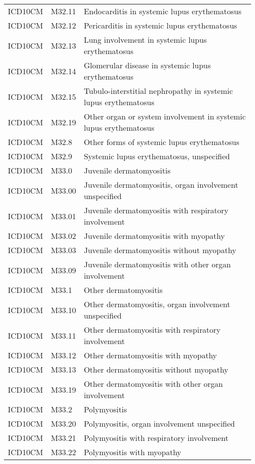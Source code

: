 \begin{longtable}{p{}p{}p{}}
  ICD10CM & M32.11 & Endocarditis in systemic lupus erythematosus \\ 
  ICD10CM & M32.12 & Pericarditis in systemic lupus erythematosus \\ 
  ICD10CM & M32.13 & Lung involvement in systemic lupus erythematosus \\ 
  ICD10CM & M32.14 & Glomerular disease in systemic lupus erythematosus \\ 
  ICD10CM & M32.15 & Tubulo-interstitial nephropathy in systemic lupus erythematosus \\ 
  ICD10CM & M32.19 & Other organ or system involvement in systemic lupus erythematosus \\ 
  ICD10CM & M32.8 & Other forms of systemic lupus erythematosus \\ 
  ICD10CM & M32.9 & Systemic lupus erythematosus, unspecified \\ 
  ICD10CM & M33.0 & Juvenile dermatomyositis \\ 
  ICD10CM & M33.00 & Juvenile dermatomyositis, organ involvement unspecified \\ 
  ICD10CM & M33.01 & Juvenile dermatomyositis with respiratory involvement \\ 
  ICD10CM & M33.02 & Juvenile dermatomyositis with myopathy \\ 
  ICD10CM & M33.03 & Juvenile dermatomyositis without myopathy \\ 
  ICD10CM & M33.09 & Juvenile dermatomyositis with other organ involvement \\ 
  ICD10CM & M33.1 & Other dermatomyositis \\ 
  ICD10CM & M33.10 & Other dermatomyositis, organ involvement unspecified \\ 
  ICD10CM & M33.11 & Other dermatomyositis with respiratory involvement \\ 
  ICD10CM & M33.12 & Other dermatomyositis with myopathy \\ 
  ICD10CM & M33.13 & Other dermatomyositis without myopathy \\ 
  ICD10CM & M33.19 & Other dermatomyositis with other organ involvement \\ 
  ICD10CM & M33.2 & Polymyositis \\ 
  ICD10CM & M33.20 & Polymyositis, organ involvement unspecified \\ 
  ICD10CM & M33.21 & Polymyositis with respiratory involvement \\ 
  ICD10CM & M33.22 & Polymyositis with myopathy \\ 

\end{longtable}
